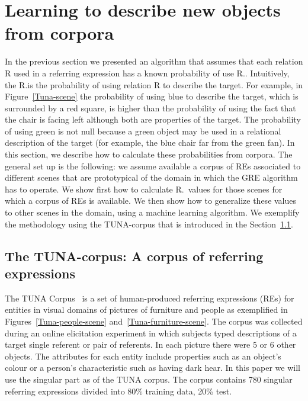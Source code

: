 \section{Learning to describe new objects from corpora}
\label{sec:learning}

In the previous section we presented an algorithm that assumes that each relation R 
used in a referring expression has a known probability of use R.\puse. 
Intuitively, the R.\puse is the probability of using relation R to describe the target. For example, in Figure~\ref{Tuna-scene} the probability of using blue to describe the target, which is surrounded by a red square, is higher than the probability of using the fact that the chair is facing left although both are properties of the target. The probability of using green is not null because a green object may be used in a relational description of the target (for example, the blue chair far from the green fan). In this section, 
we describe how to calculate these probabilities from corpora.  
The general set up is the following: we assume available a corpus of REs associated 
to different scenes that are prototypical of the domain in which the GRE algorithm has to operate.   
We show first how to calculate R.\puse\ values for those scenes for which a corpus of REs is available.  
We then show how to generalize these values to 
other scenes in the domain, using a machine learning algorithm. We exemplify the methodology using 
the TUNA-corpus that is introduced in the Section~\ref{sec:tuna}.

\subsection{The TUNA-corpus: A corpus of referring expressions}
\label{sec:tuna}
The TUNA Corpus~\cite{Gatt:2008:TCO:1708322.1708365} is a set of human-produced referring expressions (REs) for entities in visual domains of pictures of furniture and people as exemplified in Figures~\ref{Tuna-people-scene} and~\ref{Tuna-furniture-scene}. The corpus was
collected during an online elicitation experiment in which subjects typed descriptions of a target single referent or pair of referents. 
In each picture there were 5 or 6 other objects. 
The attributes for each entity include properties such as an object's colour or a person's characteristic such as having dark hear.
In this paper we will use the singular part as of the TUNA corpus. The corpus contains 780 singular referring expressions divided
into 80\% training data, 20\% test. 

